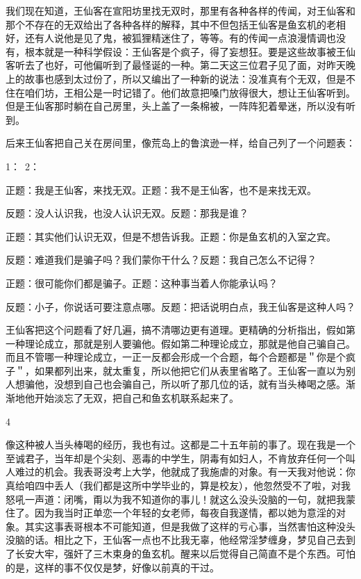 我们现在知道，王仙客在宣阳坊里找无双时，那里有各种各样的传闻，对王仙客和那个不存在的无双给出了各种各样的解释，其中不但包括王仙客是鱼玄机的老相好，还有人说他是见了鬼，被狐狸精迷住了，等等。有的传闻一点浪漫情调也没有，根本就是一种科学假设：王仙客是个疯子，得了妄想狂。要是这些故事被王仙客听去了也好，可他偏听到了最怪诞的一种。第二天这三位君子见了面，对昨天晚上的故事也感到太过份了，所以又编出了一种新的说法：没准真有个无双，但是不住在咱们坊，王相公是一时记错了。他们故意把嗓门放得很大，想让王仙客听到。但是王仙客那时躺在自己房里，头上盖了一条棉被，一阵阵犯着晕迷，所以没有听到。 

后来王仙客把自己关在房间里，像荒岛上的鲁滨逊一样，给自己列了一个问题表： 

1：\ {}2： 

正题：我是王仙客，来找无双。正题：我不是王仙客，也不是来找无双。 

反题：没人认识我，也没人认识无双。反题：那我是谁？ 

正题：其实他们认识无双，但是不想告诉我。正题：你是鱼玄机的入室之宾。 

反题：难道我们是骗子吗？我们蒙你干什么？反题：我自己怎么不记得？ 

正题：很可能你们都是骗子。正题：这种事当着人你能承认吗？ 

反题：小子，你说话可要注意点哪。反题：把话说明白点，我王仙客是这种人吗？ 

王仙客把这个问题看了好几遍，搞不清哪边更有道理。更精确的分析指出，假如第一种理论成立，那就是别人要骗他。假如第二种理论成立，那就是他自己骗自己。而且不管哪一种理论成立，一正一反都会形成一个合题，每个合题都是＂你是个疯子＂，如果都列出来，就太重复，所以他把它们从表里省略了。王仙客一直以为别人想骗他，没想到自己也会骗自己，所以听了那几位的话，就有当头棒喝之感。渐渐地他开始淡忘了无双，把自己和鱼玄机联系起来了。 

4 

像这种被人当头棒喝的经历，我也有过。这都是二十五年前的事了。现在我是一个至诚君子，当年却是个尖刻、恶毒的中学生，阴毒有如妇人，不肯放弃任何一个叫人难过的机会。我表哥没考上大学，他就成了我施虐的对象。有一天我对他说：你真给咱四中丢人（我们都是这所中学毕业的，算是校友），他忽然受不了啦，对我怒吼一声道：闭嘴，甭以为我不知道你的事儿！就这么没头没脑的一句，就把我蒙住了。因为我当时正单恋一个年轻的女老师，每夜自我遂情，都以她为意淫的对象。其实这事表哥根本不可能知道，但是我做了这样的亏心事，当然害怕这种没头没脑的话。相比之下，王仙客一点也不比我无辜，他经常淫梦缠身，梦见自己去到了长安大牢，强奸了三木束身的鱼玄机。醒来以后觉得自己简直不是个东西。可怕的是，这样的事不仅仅是梦，好像以前真的干过。 

